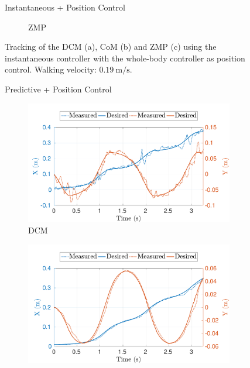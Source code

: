 \begin{figure}[t]
\begin{myframe}{Instantaneous + Position Control}
\begin{subfigure}[b]{0.49\textwidth}
        \caption{ZMP}
        \label{fig:inst_pos-min_vel-zmp}
    \end{subfigure}
    \end{myframe}
    \caption{Tracking of the DCM (a), CoM (b) and ZMP (c) using the instantaneous controller with the whole-body controller as position control. Walking velocity:  $\SI{0.19}{\meter \per \second}$.}
\end{figure}

\begin{figure}[t]
    \begin{myframe}{Predictive + Position Control}
     \centering
    \begin{subfigure}[b]{0.49\textwidth}
        \centering
        \includegraphics[width=\textwidth]{chapter_simplified_benchmarking/figures/mpc_pos-min_vel-dcm.pdf}
        \caption{DCM}
        \label{fig:mpc_pos-min_vel-dcm}
    \end{subfigure}
    \hfill
    \begin{subfigure}[b]{0.49\textwidth}
        \centering
        \includegraphics[width=\textwidth]{chapter_simplified_benchmarking/figures/mpc_pos-min_vel-com.pdf}

\end{subfigure}
\end{myframe}
\end{figure}
